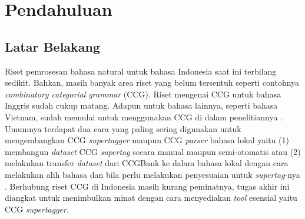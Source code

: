 \chapter{Pendahuluan}
\section{Latar Belakang}

Riset pemrosesan bahasa natural untuk bahasa Indonesia saat ini terbilang sedikit.
Bahkan, masih banyak area riset yang belum tersentuh seperti contohnya
\textit{combinatory categorial grammar} (CCG).
Riset mengenai CCG untuk bahasa Inggris sudah cukup matang.
Adapun untuk bahasa lainnya, seperti bahasa Vietnam, sudah memulai untuk menggunakan CCG di dalam
penelitiannya \cite{nguyen2019vietnamese}.
Umumnya terdapat dua cara yang paling sering digunakan untuk mengembangkan CCG \textit{supertagger}
maupun CCG \textit{parser} bahasa lokal yaitu (1) membangun \textit{dataset} CCG \textit{supertag}
secara manual maupun semi-otomatis atau (2) melakukan transfer \textit{dataset} dari CCGBank
ke dalam bahasa lokal dengan cara melakukan alih bahasa dan bila perlu melakukan penyesuaian untuk
\textit{supertag}-nya \cite{hockenmaier-steedman-2007-ccgbank}.
Berhubung riset CCG di Indonesia masih kurang peminatnya, tugas akhir ini diangkat untuk menimbulkan
minat dengan cara menyediakan \textit{tool} esensial yaitu CCG \textit{supertagger}.


